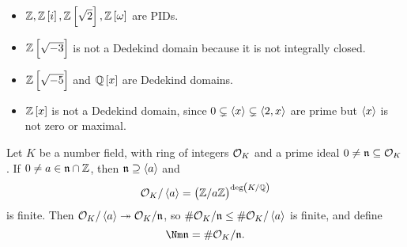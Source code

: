 \begin{example*}
\hfill
\begin{itemize}
\item $ \ZZ, \ZZ\sbr{i}, \ZZ\sbr{\sqrt{2}}, \ZZ\sbr{\omega} $ are PIDs.
\item $ \ZZ\sbr{\sqrt{-3}} $ is not a Dedekind domain because it is not integrally closed.
\item $ \ZZ\sbr{\sqrt{-5}} $ and $ \QQ\sbr{x} $ are Dedekind domains.
\item $ \ZZ\sbr{x} $ is not a Dedekind domain, since $ 0 \subsetneq \left\langle x \right\rangle \subsetneq \left\langle 2, x \right\rangle $ are prime but $ \left\langle x \right\rangle $ is not zero or maximal.
\end{itemize}
\end{example*}

\begin{definition}
Let $ K $ be a number field, with ring of integers $ \mathcal{O}_K $ and a prime ideal $ 0 \ne \mathfrak{n} \subseteq \mathcal{O}_K $. If $ 0 \ne a \in \mathfrak{n} \cap \mathbb{Z} $, then $ \mathfrak{n} \supseteq \left\langle a \right\rangle $ and
$$ \OOO_K / \abr{a} = \br{\ZZ / a\ZZ}^{\deg \br{K / \QQ}} $$
is finite. Then $ \mathcal{O}_K / \left\langle a \right\rangle \twoheadrightarrow \mathcal{O}_K / \mathfrak{n} $, so $ \#\mathcal{O}_K / \mathfrak{n} \le \#\mathcal{O}_K / \left\langle a \right\rangle $ is finite, and define
$$ \Nm \nnn = \#\OOO_K / \nnn. $$
\end{definition}

